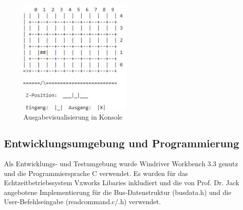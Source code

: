 \begin{figure}[H]
	\centering
  \includegraphics[width=0.5\textwidth]{diagrams/console_output.JPG}
	\caption{Ausgabevisualisierung in Konsole}
	\label{fig3}
\end{figure}

\subsection{Entwicklungsumgebung und Programmierung}
Als Entwicklungs- und Testumgebung wurde Windriver Workbench 3.3 genutz und die Programmiersprache C verwendet.
Es wurden für das Echtzeitbetriebssystem Vxworks Libaries inkludiert und die von Prof. Dr. Jack angebotene Implementierung für die Bus-Datenstruktur (busdata.h) und die User-Befehlseingabe (readcommand.c/.h) verwendet.


